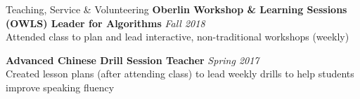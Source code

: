 \documentclass{resume}
\begin{document}
\begin{rSection}{Teaching, Service \& Volunteering}
{\bf Oberlin Workshop \& Learning Sessions (OWLS) Leader for Algorithms} \hfill {\em Fall 2018} \\
{ Attended class to plan and lead interactive, non-traditional workshops (weekly)} 


{\bf Advanced Chinese Drill Session Teacher} \hfill {\em Spring 2017} \\
{ Created lesson plans (after attending class) to lead weekly drills to help students improve speaking fluency}










\end{rSection}
\end{document}
